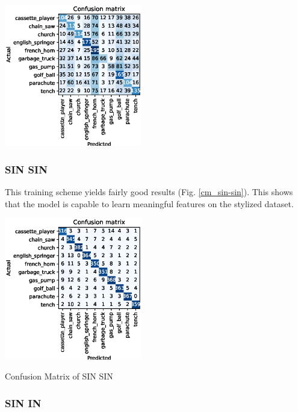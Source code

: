\documentclass{article}
\begin{document}
\begin{center}
  \captionsetup{type=figure}
  \includegraphics[width = 0.45\textwidth]{imgs/in/in-sin/in-sin_confusion_matrix_0.313.eps}
  \label{cm_in-sin}
\end{center}

\subsubsection{SIN \texorpdfstring{\textrightarrow} .SIN}
This training scheme yields fairly good results (Fig. \ref{cm_sin-sin}). This shows that the model is capable to learn
meaningful features on the stylized dataset.

\begin{center}
  \captionsetup{type=figure}
  \includegraphics[width = 0.45\textwidth]{imgs/sin/sin-sin/sin-sin_confusion_matrix_0.908.eps}
  \caption{Confusion Matrix of SIN \texorpdfstring{\textrightarrow} .SIN}
  \label{cm_sin-sin}
\end{center}

\subsubsection{SIN \texorpdfstring{\textrightarrow} .IN}
\end{document}
